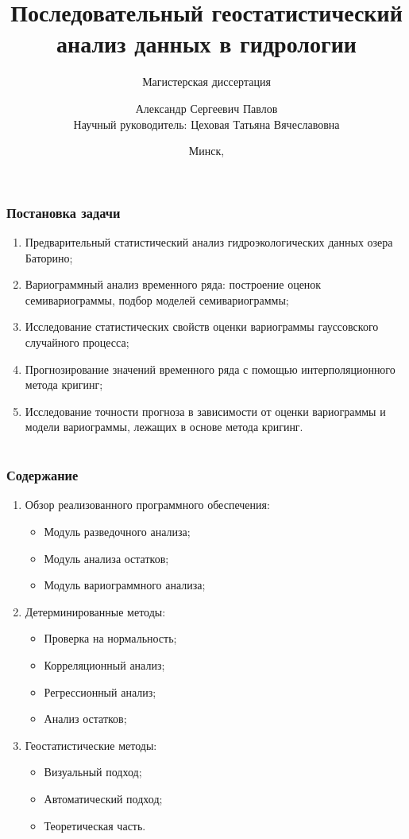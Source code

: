 \documentclass[notheorems]{beamer}
\title[Последовательный геостатистический анализ данных в гидрологии]{Последовательный геостатистический анализ данных в гидрологии}
\subtitle{Магистерская диссертация}
\author[Павлов А.С.]{Александр Сергеевич Павлов \\ \smallskip \footnotesize{Научный руководитель: Цеховая Татьяна Вячеславовна}}
\institute[БГУ, ФПМИ]{Факультет прикладной математики и информатики \\ \smallskip Кафедра теории вероятностей и математической статистики}
\date{Минск, \the\year}
\theoremstyle{definition}
\theoremstyle{example}
\theoremstyle{plain}
\begin{document}
\begin{frame}[plain]
  \titlepage
\end{frame}

\begin{frame}
  \frametitle{Постановка задачи}
  \begin{enumerate}
    \item Предварительный статистический анализ гидроэкологических данных озера Баторино;
    \item Вариограммный анализ временного ряда: построение оценок семивариограммы, подбор моделей семивариограммы;
    \item Исследование статистических свойств оценки вариограммы гауссовского случайного процесса;
    \item Прогнозирование значений временного ряда с помощью интерполяционного метода кригинг;
    \item Исследование точности прогноза в зависимости от оценки вариограммы и модели вариограммы, лежащих в основе метода кригинг.
  \end{enumerate}
\end{frame}

\section[Содержание]{}
\begin{frame}
  \frametitle{Содержание}
  \begin{enumerate}
    \item Обзор реализованного программного обеспечения:
      \begin{itemize}
        \item Модуль разведочного анализа;
        \item Модуль анализа остатков;
        \item Модуль вариограммного анализа;
      \end{itemize}
    \item Детерминированные методы:
      \begin{itemize}
        \item Проверка на нормальность;
        \item Корреляционный анализ;
        \item Регрессионный анализ;
        \item Анализ остатков;
      \end{itemize}
    \item Геостатистические методы:
      \begin{itemize}
        \item Визуальный подход;
        \item Автоматический подход;
        \item Теоретическая часть.
      \end{itemize}
  \end{enumerate}
\end{frame}
\end{document}

